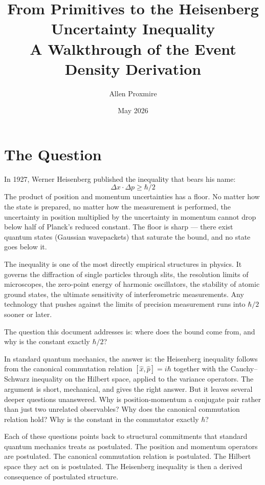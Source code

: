 \documentclass[11pt,a4paper]{article}
\title{\vspace{-1cm}\Large\bfseries From Primitives to the Heisenberg Uncertainty Inequality\\[6pt]
\large\mdseries A Walkthrough of the Event Density Derivation}
\author{Allen Proxmire}
\date{May 2026}
\begin{document}
\maketitle
\thispagestyle{empty}

\section{The Question}

In 1927, Werner Heisenberg published the inequality that bears his name:
\[
\Delta x \cdot \Delta p \geq \hbar/2
\]
The product of position and momentum uncertainties has a floor. No matter how the state is prepared, no matter how the measurement is performed, the uncertainty in position multiplied by the uncertainty in momentum cannot drop below half of Planck's reduced constant. The floor is sharp --- there exist quantum states (Gaussian wavepackets) that saturate the bound, and no state goes below it.

The inequality is one of the most directly empirical structures in physics. It governs the diffraction of single particles through slits, the resolution limits of microscopes, the zero-point energy of harmonic oscillators, the stability of atomic ground states, the ultimate sensitivity of interferometric measurements. Any technology that pushes against the limits of precision measurement runs into $\hbar/2$ sooner or later.

The question this document addresses is: where does the bound come from, and why is the constant exactly $\hbar/2$?

In standard quantum mechanics, the answer is: the Heisenberg inequality follows from the canonical commutation relation $[\hat{x}, \hat{p}] = i\hbar$ together with the Cauchy--Schwarz inequality on the Hilbert space, applied to the variance operators. The argument is short, mechanical, and gives the right answer. But it leaves several deeper questions unanswered. Why is position-momentum a conjugate pair rather than just two unrelated observables? Why does the canonical commutation relation hold? Why is the constant in the commutator exactly $\hbar$?

Each of these questions points back to structural commitments that standard quantum mechanics treats as postulated. The position and momentum operators are postulated. The canonical commutation relation is postulated. The Hilbert space they act on is postulated. The Heisenberg inequality is then a derived consequence of postulated structure.
\end{document}

